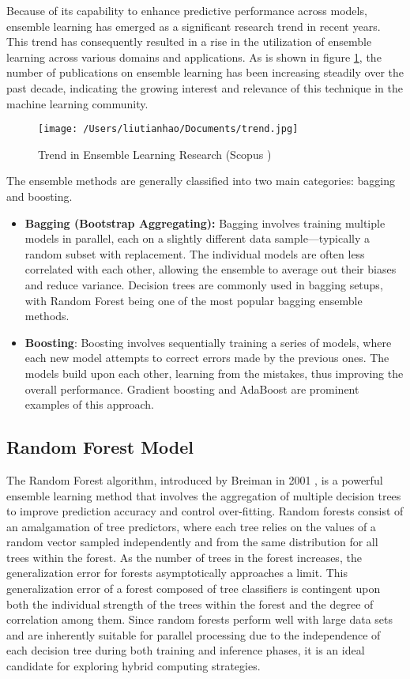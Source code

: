 \documentclass[13pt]{article}
\begin{document}
Because of its capability to enhance predictive performance across models, ensemble learning has emerged as a significant research trend in recent years. 
This trend has consequently resulted in a rise in the utilization of ensemble learning across various domains and applications.
As is shown in figure \ref{fig:trend}, the number of publications on ensemble learning has been increasing steadily over the past decade, indicating the growing interest and relevance of this technique in the machine learning community.
\begin{figure}[ht]
    \centering
    \texttt{[image: /Users/liutianhao/Documents/trend.jpg]}
    \caption{Trend in Ensemble Learning Research (Scopus \cite{scopus})}
    \label{fig:trend}
\end{figure}

The ensemble methods are generally classified into two main categories: bagging and boosting.
\begin{itemize}
    \item \textbf{Bagging (Bootstrap Aggregating):} 
    Bagging involves training multiple models in parallel, each on a slightly different data sample—typically a random subset with replacement. The individual models are often less correlated with each other, allowing the ensemble to average out their biases and reduce variance. Decision trees are commonly used in bagging setups, with Random Forest being one of the most popular bagging ensemble methods.
    \item \textbf{Boosting}:
    Boosting involves sequentially training a series of models, where each new model attempts to correct errors made by the previous ones. The models build upon each other, learning from the mistakes, thus improving the overall performance. Gradient boosting and AdaBoost are prominent examples of this approach.
\end{itemize}


\subsection{Random Forest Model}
The Random Forest algorithm, introduced by Breiman in 2001 \cite{random_forest}, is a powerful ensemble learning method that involves the aggregation of multiple decision trees to improve prediction accuracy and control over-fitting. 
Random forests consist of an amalgamation of tree predictors, where each tree relies on the values of a random vector sampled independently and from the same distribution for all trees within the forest. 
As the number of trees in the forest increases, the generalization error for forests asymptotically approaches a limit. 
This generalization error of a forest composed of tree classifiers is contingent upon both the individual strength of the trees within the forest and the degree of correlation among them.
Since random forests perform well with large data sets and are inherently suitable for parallel processing due to the independence of each decision tree during both training and inference phases, it is an ideal candidate for exploring hybrid computing strategies.
\newpage
\end{document}
